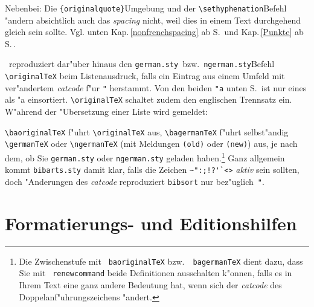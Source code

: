 \documentclass[12pt,a4paper]{article}
\newcommand{\pbs}{\string\ \unskip}
\newcommand{\bs}{\protect\pbs}
\begin{document}
\vspace{1.5ex}\noindent
Nebenbei: Die \verb|{originalquote}|\hy Umgebung und der
\verb|\sethyphenation|\hy Befehl "andern absichtlich auch das 
\textit{spacing} nicht, weil dies in einem Text durchgehend gleich sein sollte.
Vgl. unten Kap.\,\ref{nonfrenchspacing} ab S.\,\pageref{nonfrenchspacing} und 
Kap.\,\ref{Punkte} ab S.\,\pageref{Punkte}.

\vspace{1.5ex}\noindent
\BibArts\ reproduziert dar"uber hinaus den \verb|german.sty|\hy\ bzw.\ 
\verb|ngerman.sty|\hy Befehl \verb|\originalTeX| beim Listenausdruck, 
falls ein Eintrag aus einem Umfeld mit ver"andertem \textit{catcode} f"ur \verb|"| 
herstammt. Von den beiden \verb|"a| unten S.\,\pageref{originaltex}
ist nur eines als "a einsortiert. \verb|\originalTeX| schaltet zudem
den englischen Trennsatz ein. W"ahrend der "Ubersetzung einer 
\BibArts\hy Liste wird gemeldet:

\vspace{-.75ex}{\scriptsize\begin{verbatim}
     [bibsort] Set \baoriginalTeX in line 51 of BibArts file. 
     [bibsort] Reproduce hyphenation 0 in line 52 of BibArts file. 
     [bibsort] Set \bagermanTeX in line 61 of BibArts file.  (new)
     [bibsort] Reproduce hyphenation 44 in line 62 of BibArts file.
\end{verbatim}}

\vspace{-1ex}\noindent
\verb|\baoriginalTeX| f"uhrt \verb|\originalTeX| aus, \verb|\bagermanTeX| 
f"uhrt selbst"andig \verb|\germanTeX| oder \verb|\ngermanTeX|
(mit Meldungen \texttt{\footnotesize (old)} oder \texttt{\footnotesize (new)}) aus, 
je nach dem, ob Sie \verb|german.sty|
oder \verb|ngerman.sty| geladen haben.\footnote{Die Zwischenstufe mit
\texttt{\bs baoriginalTeX} bzw.\ \texttt{\bs bagermanTeX} dient dazu, dass
Sie mit \texttt{\bs renewcommand} beide Definitionen ausschalten k"onnen,
falls es in Ihrem Text eine ganz andere Bedeutung hat, wenn sich der 
\textit{catcode} des Doppelanf"uhrungszeichens "andert.}
Ganz allgemein kommt \verb|bibarts.sty| damit klar, falls die
Zeichen \verb|~":;!?'`<>| \textit{aktiv} sein sollten, doch "Anderungen
\label{catcode}
des \textit{catcode} reproduziert \verb|bibsort| nur bez"uglich~\verb|"|.


\section{Formatierungs- und Editionshilfen}\label{Sect3}
\end{document}
